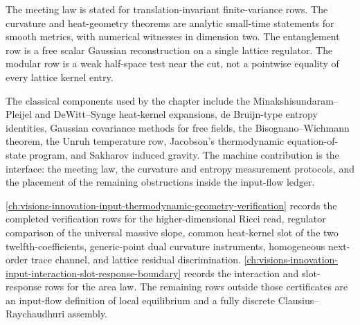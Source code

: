 \begin{principle}
\label{prin:innovation-input-thermo-certificate-scope}
The meeting law is stated for translation-invariant finite-variance rows.
The curvature and heat-geometry theorems are analytic small-time
statements for smooth metrics, with numerical witnesses in dimension two.
The entanglement row is a free scalar Gaussian reconstruction on a single
lattice regulator. The modular row is a weak half-space test near the cut,
not a pointwise equality of every lattice kernel entry.
\end{principle}

\begin{principle}
\label{prin:innovation-input-thermo-external-correspondence-ledger}
The classical components used by the chapter include the
Minakshisundaram--Pleijel and DeWitt--Synge heat-kernel expansions,
de Bruijn-type entropy identities, Gaussian covariance methods for free
fields, the Bisognano--Wichmann theorem, the Unruh temperature row,
Jacobson's thermodynamic equation-of-state program, and Sakharov induced
gravity. The machine contribution is the interface: the meeting law, the
curvature and entropy measurement protocols, and the placement of the
remaining obstructions inside the input-flow ledger.
\end{principle}

\begin{principle}
\label{prin:innovation-input-thermo-open-verification-rows}
\autoref{ch:visions-innovation-input-thermodynamic-geometry-verification}
records the completed verification rows for the higher-dimensional Ricci
read, regulator comparison of the universal massive slope, common
heat-kernel slot of the two twelfth-coefficients, generic-point dual
curvature instruments, homogeneous next-order trace channel, and lattice
residual discrimination.
\autoref{ch:visions-innovation-input-interaction-slot-response-boundary}
records the interaction and slot-response rows for the area law. The
remaining rows outside those certificates are an input-flow definition of
local equilibrium and a fully discrete Clausius--Raychaudhuri assembly.
\end{principle}


